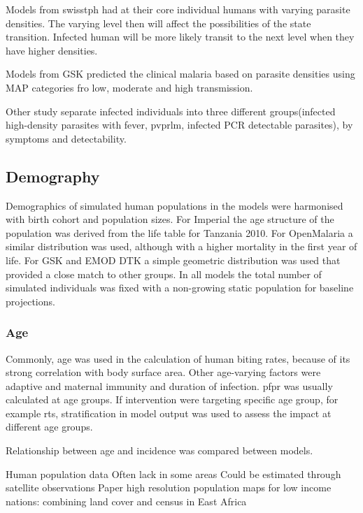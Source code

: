 \documentclass[a4paper, 12pt, twoside]{article}
\begin{document}
Models from \gls{swisstph} had at their core individual humans with varying parasite densities. The varying level then will affect the possibilities of the state transition. Infected human will be more likely transit to the next level when they have higher densities.

Models from GSK predicted the clinical malaria based on parasite densities using MAP categories fro low, moderate and high transmission.\cite{Hay2004}

Other study separate infected individuals into three different groups(infected high-density parasites with fever, \gls{pvprlm}, infected PCR detectable parasites)\cite{White2018b}, by symptoms and detectability.

\subsection{Demography}
Demographics of simulated human populations in the models were harmonised with birth cohort and population sizes.
For Imperial the age structure of the population was derived from the life table for Tanzania 2010.
For OpenMalaria a similar distribution was used, although with a higher mortality in the first year of life.
For GSK and EMOD DTK a simple geometric distribution was used that provided a close match to other groups.
In all models the total number of simulated individuals was fixed with a non-growing static population for baseline projections.

\subsubsection{Age}
Commonly, age was used in the calculation of human biting rates, because of its strong correlation with body surface area.
Other age-varying factors were adaptive and maternal immunity and duration of infection.
\gls{pfpr} was usually calculated at age groups.
If intervention were targeting specific age group, for example \gls{rts}, stratification in model output was used to assess the impact at different age groups.

Relationship between age and incidence was compared between models.

Human population data
Often lack in some areas
Could be estimated through satellite observations
Paper high resolution population maps for low income nations: combining land cover and census in East Africa
\end{document}
